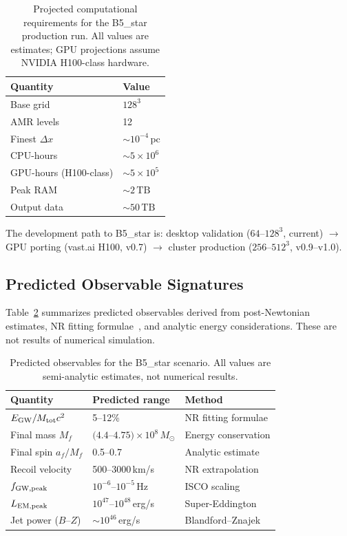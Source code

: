 \documentclass[aps,prd,twocolumn,superscriptaddress,nofootinbib,showpacs,
               longbibliography]{revtex4-2}
\newcommand{\Msun}{M_\odot}
\begin{document}
\begin{table}[t]
\caption{Projected computational requirements for the B5\_star production run.
  All values are estimates; GPU projections assume NVIDIA H100-class hardware.}
\label{tab:b5_compute}
\begin{ruledtabular}
\begin{tabular}{ll}
  Quantity & Value \\ \hline
  Base grid & $128^3$ \\
  AMR levels & 12 \\
  Finest $\Delta x$ & ${\sim}10^{-4}\,\text{pc}$ \\
  CPU-hours & ${\sim}5\times10^6$ \\
  GPU-hours (H100-class) & ${\sim}5\times10^5$ \\
  Peak RAM & ${\sim}2\,\text{TB}$ \\
  Output data & ${\sim}50\,\text{TB}$ \\
\end{tabular}
\end{ruledtabular}
\end{table}

The development path to B5\_star is:
desktop validation ($64$--$128^3$, current)
$\to$ GPU porting (vast.ai H100, v0.7)
$\to$ cluster production ($256$--$512^3$, v0.9--v1.0).

\subsection{Predicted Observable Signatures}
\label{sec:b5_observables}

Table~\ref{tab:b5_obs} summarizes predicted observables derived from
post-Newtonian estimates, NR fitting formulae~\cite{Healy2014}, and
analytic energy considerations.
These are not results of numerical simulation.

\begin{table}[t]
\caption{Predicted observables for the B5\_star scenario.
  All values are semi-analytic estimates, not numerical results.}
\label{tab:b5_obs}
\begin{ruledtabular}
\begin{tabular}{lll}
  Quantity & Predicted range & Method \\ \hline
  $E_{\rm GW}/M_{\rm tot}c^2$ & 5--12\% & NR fitting formulae \\
  Final mass $M_f$ & $(4.4$--$4.75)\times10^8\,\Msun$ & Energy conservation \\
  Final spin $a_f/M_f$ & 0.5--0.7 & Analytic estimate \\
  Recoil velocity & 500--3000\,km/s & NR extrapolation \\
  $f_{\rm GW,peak}$ & $10^{-6}$--$10^{-5}$\,Hz & ISCO scaling \\
  $L_{\rm EM,peak}$ & $10^{47}$--$10^{48}$\,erg/s & Super-Eddington \\
  Jet power ($B$--$Z$) & ${\sim}10^{46}$\,erg/s & Blandford--Znajek \\
\end{tabular}
\end{ruledtabular}
\end{table}
\end{document}
